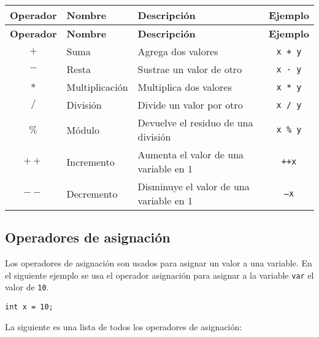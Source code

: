 \documentclass[12pt]{article}
\theoremstyle{largebreak}
\begin{document}
    \begin{longtable}{c l p{} c}
    \toprule
    \textbf{Operador} & \textbf{Nombre} & \textbf{Descripción} & \textbf{Ejemplo} \\
    \midrule
    \endfirsthead

    \midrule
    \textbf{Operador} & \textbf{Nombre} & \textbf{Descripción} & \textbf{Ejemplo} \\
    \midrule
    \endhead

    \bottomrule
    \endfoot

    $+$ & Suma & Agrega dos valores & \texttt{x + y} \\
    $-$ & Resta & Sustrae un valor de otro & \texttt{x - y} \\
    $*$ & Multiplicación & Multiplica dos valores & \texttt{x * y} \\
    $/$ & División & Divide un valor por otro & \texttt{x / y} \\
    $\%$ & Módulo & Devuelve el residuo de una división & \texttt{x \% y} \\
    $++$ & Incremento & Aumenta el valor de una variable en 1 & \texttt{++x} \\
    $--$ & Decremento & Disminuye el valor de una variable en 1 & \texttt{--x} \\
    \end{longtable}

    \subsection{Operadores de asignación}

    Los operadores de asignación son usados para asignar un valor a una variable. En el siguiente ejemplo se usa el operador asignación para asignar a la variable \lstinline|var| el valor de \lstinline|10|.
    \begin{lstlisting}[caption={Operador asignación.},label=DescriptiveLabel]
int x = 10;
    \end{lstlisting}

    La siguiente es una lista de todos los operadores de asignación:
\end{document}
